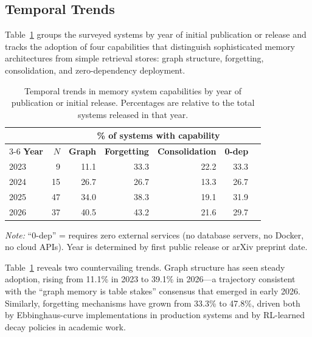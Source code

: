 \subsection{Temporal Trends}
\label{sec:temporal-trends}

Table~\ref{tab:temporal-trends} groups the surveyed systems by year of initial
publication or release and tracks the adoption of four capabilities that
distinguish sophisticated memory architectures from simple retrieval stores:
graph structure, forgetting, consolidation, and zero-dependency deployment.

\begin{table}[!t]
\centering
\caption{Temporal trends in memory system capabilities by year of publication or initial release. Percentages are relative to the total systems released in that year.}
\label{tab:temporal-trends}
\small
\begin{tabular}{@{}lrrrrrr@{}}
\toprule
& & \multicolumn{4}{c}{\textbf{\% of systems with capability}} \\
\cmidrule(l){3-6}
\textbf{Year} & \textbf{$N$} & \textbf{Graph} & \textbf{Forgetting} & \textbf{Consolidation} & \textbf{0-dep} \\
\midrule
2023 &  9 & 11.1 & 33.3 & 22.2 & 33.3 \\
2024 & 15 & 26.7 & 26.7 & 13.3 & 26.7 \\
2025 & 47 & 34.0 & 38.3 & 19.1 & 31.9 \\
2026 & 37 & 40.5 & 43.2 & 21.6 & 29.7 \\
\bottomrule
\end{tabular}
\vspace{0.3em}
\begin{flushleft}
\footnotesize
\textit{Note:} ``0-dep'' = requires zero external services (no database servers, no Docker, no cloud APIs). Year is determined by first public release or arXiv preprint date.
\end{flushleft}
\end{table}

Table~\ref{tab:temporal-trends} reveals two countervailing trends. Graph
structure has seen steady adoption, rising from 11.1\% in 2023 to 39.1\% in
2026---a trajectory consistent with the ``graph memory is table stakes''
consensus that emerged in early 2026. Similarly, forgetting mechanisms have
grown from 33.3\% to 47.8\%, driven both by Ebbinghaus-curve implementations in
production systems and by RL-learned decay policies in academic work.

